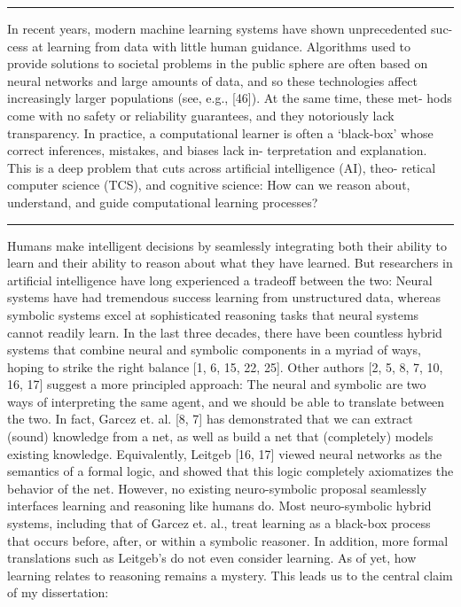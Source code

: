 \documentclass[letterpaper]{article}
\begin{document}
\hrule

In recent years, modern machine learning systems have shown unprecedented suc-
cess at learning from data with little human guidance. Algorithms used to provide solutions to societal
problems in the public sphere are often based on neural networks and large amounts of data, and so
these technologies affect increasingly larger populations (see, e.g., [46]). At the same time, these met-
hods come with no safety or reliability guarantees, and they notoriously lack transparency. In practice,
a computational learner is often a ‘black-box’ whose correct inferences, mistakes, and biases lack in-
terpretation and explanation. This is a deep problem that cuts across artificial intelligence (AI), theo-
retical computer science (TCS), and cognitive science: How can we reason about, understand, and
guide computational learning processes?

\hrule

Humans make intelligent decisions by seamlessly integrating both their ability to learn and their
ability to reason about what they have learned. But researchers in artificial intelligence have long
experienced a tradeoff between the two: Neural systems have had tremendous success learning from
unstructured data, whereas symbolic systems excel at sophisticated reasoning tasks that neural
systems cannot readily learn. In the last three decades, there have been countless hybrid systems
that combine neural and symbolic components in a myriad of ways, hoping to strike the right
balance [1, 6, 15, 22, 25]. Other authors [2, 5, 8, 7, 10, 16, 17] suggest a more principled approach:
The neural and symbolic are two ways of interpreting the same agent, and we should be able to
translate between the two. In fact, Garcez et. al. [8, 7] has demonstrated that we can extract
(sound) knowledge from a net, as well as build a net that (completely) models existing knowledge. Equivalently, Leitgeb [16, 17] viewed neural networks as the semantics of a formal logic, and showed
that this logic completely axiomatizes the behavior of the net. However, no existing neuro-symbolic proposal seamlessly interfaces learning and reasoning like
humans do. Most neuro-symbolic hybrid systems, including that of Garcez et. al., treat learning
as a black-box process that occurs before, after, or within a symbolic reasoner. In addition, more
formal translations such as Leitgeb's do not even consider learning. As of yet, how learning relates
to reasoning remains a mystery. This leads us to the central claim of my dissertation:
\end{document}
